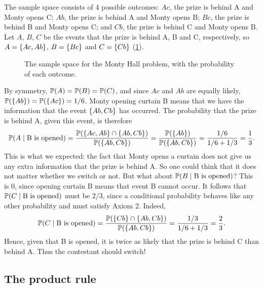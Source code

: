 \begin{solution}
The sample space consists of 4 possible outcomes: $Ac$, the prize is behind A and Monty opens C; $Ab$, the prize is behind A and Monty opens B; $Bc$, the prize is behind B and Monty opens C; and $Cb$, the prize is behind C and Monty opens B. Let $A$, $B$, $C$ be the events that the prize is behind A, B and C, respectively, so $A = \left\{ Ac, Ab \right\}$, $B = \left\{ Bc \right\}$ and $C = \left\{ Cb \right\}$ (\cref{fig:monty-hall}).

\begin{figure}[H]
\centering
{}
\caption{The sample space for the Monty Hall problem, with the probability of each outcome.}
\label{fig:monty-hall}
\end{figure}

By symmetry, $\mathbb{P}(A) = \mathbb{P}(B) = \mathbb{P}(C)$, and since $Ac$ and $Ab$ are equally likely, $\mathbb{P}(\left\{ Ab \right\}) = \mathbb{P}(\left\{ Ac \right\}) = 1/6$. Monty opening curtain B means that we have the information that the event $\left\{ Ab, Cb \right\}$ has occurred. The probability that the prize is behind A, given this event, is therefore
\[
  \mathbb{P}(A \mid \text{B is opened}) = \frac{\mathbb{P}(\left\{ Ac, Ab \right\} \cap \left\{ Ab, Cb \right\})}{\mathbb{P}(\left\{ Ab, Cb \right\})} = \frac{\mathbb{P}(\left\{ Ab \right\})}{\mathbb{P}(\left\{ Ab, Cb \right\})} = \frac{1/6}{1/6 + 1/3} = \frac13.
\]
This is what we expected: the fact that Monty opens a curtain does not give us any extra information that the prize is behind A. So one could think that it does not matter whether we switch or not. But what about $\mathbb{P}(B \mid \text{B is opened})$? This is 0, since opening curtain B means that event B cannot occur. It follows that $\mathbb{P}(C \mid \text{B is opened})$ must be $2/3$, since a conditional probability behaves like any other probability and must satisfy Axiom 2. Indeed,
\[
  \mathbb{P}(C \mid \text{B is opened}) = \frac{\mathbb{P}(\left\{ Cb \right\} \cap \left\{ Ab, Cb \right\})}{\mathbb{P}(\left\{ Ab, Cb \right\})} = \frac{1/3}{1/6 + 1/3} = \frac23.
\]
Hence, given that B is opened, it is twice as likely that the prize is behind C than behind A. Thus the contestant should switch!
\end{solution}

\subsection{The product rule}\label{sec:product-rule}

